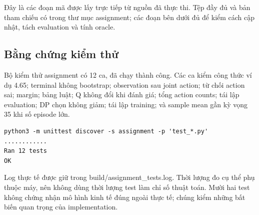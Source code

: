 Đây là các đoạn mã được lấy trực tiếp từ nguồn đã thực thi. Tệp đầy đủ
và bản tham chiếu có trong thư mục assignment; các đoạn bên dưới đủ để
kiểm cách cập nhật, tách evaluation và tính oracle.





\subsection{Bằng chứng kiểm
thử}\label{bux1eb1ng-chux1ee9ng-kiux1ec3m-thux1eed}

Bộ kiểm thử assignment có 12 ca, đã chạy thành công. Các ca kiểm công
thức ví dụ 4.65; terminal không bootstrap; observation sau joint action;
từ chối action sai; margin; bảng luật; Q không đổi khi đánh giá; tổng
action counts; tái lập evaluation; DP chọn không giảm; tái lập training;
và sample mean gần kỳ vọng 35 khi số episode lớn.

\begin{verbatim}
python3 -m unittest discover -s assignment -p 'test_*.py'
............
Ran 12 tests
OK
\end{verbatim}

Log thực tế được giữ trong build/assignment\_tests.log. Thời lượng đo cụ
thể phụ thuộc máy, nên không dùng thời lượng test làm chỉ số thuật toán.
Mười hai test không chứng nhận mô hình kinh tế đúng ngoài thực tế; chúng
kiểm những bất biến quan trọng của implementation.
